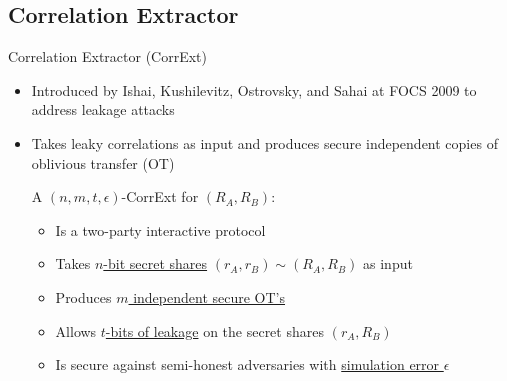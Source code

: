 \subsection{Correlation Extractor}
\begin{frame}{Correlation Extractor (CorrExt)}
	\begin{itemize}
		\item Introduced by Ishai, Kushilevitz, Ostrovsky, and Sahai at FOCS 2009 \cite{FOCS:IKOS09} to address leakage attacks 
		\item Takes leaky correlations as input and produces secure independent
		copies of oblivious transfer (OT)
		\pause
		\begin{definition}
			A $ (n,m,t,\epsilon) $-CorrExt for $ (R_A, R_B) $: 
			\begin{itemize}
				\item Is a two-party interactive protocol	
				\item Takes \underline{$n$-bit secret shares} $ (r_A, r_B) \sim (R_A, R_B) $ as input
				\item Produces \underline{$ m $ independent secure OT's}
				\item Allows \underline{$ t $-bits of leakage} on the secret shares $ (r_A, R_B) $
				\item Is secure against semi-honest adversaries with \underline{simulation error $ \epsilon $}
			\end{itemize}
		\end{definition}
	\end{itemize}
\end{frame}
	

